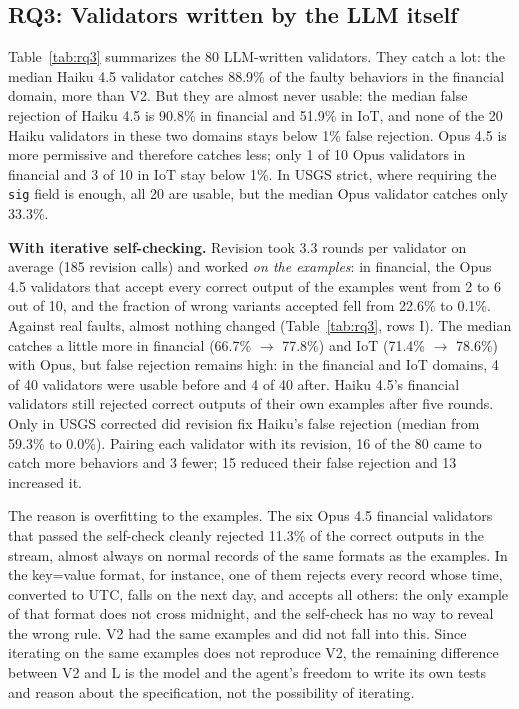 \documentclass[sigconf,nonacm]{acmart}
\begin{document}
\subsection{RQ3: Validators written by the LLM itself}
\label{sec:rq3}

Table~\ref{tab:rq3} summarizes the 80 LLM-written validators. They catch a lot: the median Haiku 4.5 validator catches 88.9\% of the faulty behaviors in the financial domain, more than V2. But they are almost never usable: the median false rejection of Haiku 4.5 is 90.8\% in financial and 51.9\% in IoT, and none of the 20 Haiku validators in these two domains stays below 1\% false rejection. Opus 4.5 is more permissive and therefore catches less; only 1 of 10 Opus validators in financial and 3 of 10 in IoT stay below 1\%. In USGS strict, where requiring the \texttt{sig} field is enough, all 20 are usable, but the median Opus validator catches only 33.3\%.

\textbf{With iterative self-checking.} Revision took 3.3 rounds per validator on average (185 revision calls) and worked \textit{on the examples}: in financial, the Opus 4.5 validators that accept every correct output of the examples went from 2 to 6 out of 10, and the fraction of wrong variants accepted fell from 22.6\% to 0.1\%. Against real faults, almost nothing changed (Table~\ref{tab:rq3}, rows I). The median catches a little more in financial (66.7\% $\to$ 77.8\%) and IoT (71.4\% $\to$ 78.6\%) with Opus, but false rejection remains high: in the financial and IoT domains, 4 of 40 validators were usable before and 4 of 40 after. Haiku 4.5's financial validators still rejected correct outputs of their own examples after five rounds. Only in USGS corrected did revision fix Haiku's false rejection (median from 59.3\% to 0.0\%). Pairing each validator with its revision, 16 of the 80 came to catch more behaviors and 3 fewer; 15 reduced their false rejection and 13 increased it.

The reason is overfitting to the examples. The six Opus 4.5 financial validators that passed the self-check cleanly rejected 11.3\% of the correct outputs in the stream, almost always on normal records of the same formats as the examples. In the key=value format, for instance, one of them rejects every record whose time, converted to UTC, falls on the next day, and accepts all others: the only example of that format does not cross midnight, and the self-check has no way to reveal the wrong rule. V2 had the same examples and did not fall into this. Since iterating on the same examples does not reproduce V2, the remaining difference between V2 and L is the model and the agent's freedom to write its own tests and reason about the specification, not the possibility of iterating.
\end{document}
